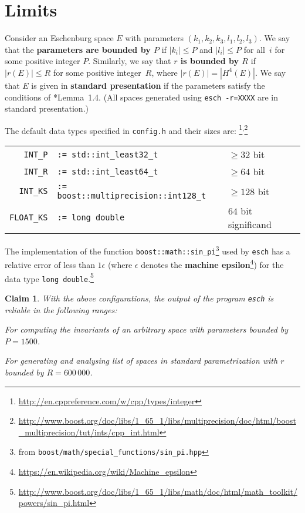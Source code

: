 \documentclass{article}
\newtheorem{claim}{Claim}
\newcommand{\abs}[1]{\left|#1\right|}
\newcommand{\macheps}{\epsilon} %
\begin{document}
\section*{Limits}
Consider an Eschenburg space \(E\) with parameters \((k_1,k_2,k_3,l_1,l_2,l_3)\).   We say that the \textbf{parameters are bounded by \(P\)} if \(\abs{k_i}\leq P\) and \(\abs{l_i}\leq P\) for all~\(i\) for some positive integer \(P\).  Similarly, we say that \textbf{\(r\) is bounded by \(R\)} if \(\abs{r(E)}\leq R\) for some positive integer~\(R\), where  \(\abs{r(E)} = |H^4(E)|\).  We say that \(E\) is given in \textbf{standard presentation} if the parameters satisfy the conditions of \cite{CEZ}*{Lemma~1.4}.  (All spaces generated using \verb+esch -r=XXXX+ are in standard presentation.)

The default data types specified in \verb+config.h+ and their sizes are:%
\footnote{
  \url{http://en.cppreference.com/w/cpp/types/integer}
}\textsuperscript{,}\footnote{
  \mbox{\url{http://www.boost.org/doc/libs/1_65_1/libs/multiprecision/doc/html/boost_multiprecision/tut/ints/cpp_int.html}}%
}

  \begin{tabular}{rp{18em}l}
    \verb+INT_P+ & \verb+:= std::int_least32_t+ & \(\geq 32\) bit \\
    \verb+INT_R+ & \verb+:= std::int_least64_t+ & \(\geq 64\) bit \\
    \verb+INT_KS+ & \verb+:= boost::multiprecision::int128_t+ & \(\geq 128\) bit \\
    \verb+FLOAT_KS+ & \verb+:= long double+ & \(64\) bit significand
  \end{tabular}

The implementation of the function \verb+boost::math::sin_pi+\footnote{
  from \verb+boost/math/special_functions/sin_pi.hpp+%
}
used by \verb+esch+ has a relative error of less than \(1\macheps\) (where \(\macheps\) denotes the \textbf{machine epsilon}\footnote{\label{footnote:macheps}%
  \url{https://en.wikipedia.org/wiki/Machine_epsilon}
})
for the data type \texttt{long double}.\footnote{
  \mbox{\url{http://www.boost.org/doc/libs/1_65_1/libs/math/doc/html/math_toolkit/powers/sin_pi.html}}%
}

\begin{claim}\label{claim:default}
  With the above configurations, the output of the program \verb+esch+ is reliable in the following ranges:
  \begin{compactitem}
  \item For computing the invariants of an arbitrary space with parameters bounded by \(P=1500\).
  \item For generating and analysing list of spaces in standard parametrization with \(r\) bounded by \(R=600\,000\).
  \end{compactitem}
\end{claim}
\end{document}
